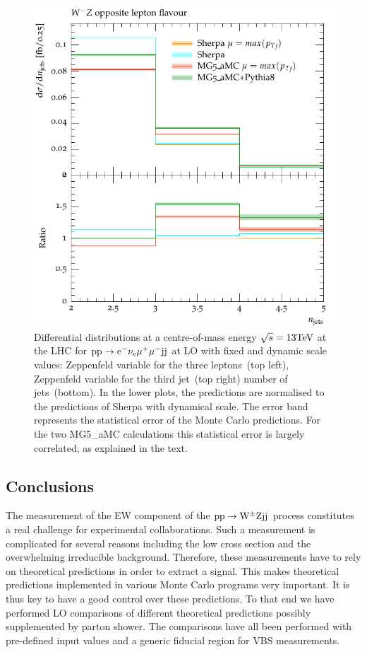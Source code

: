 \documentclass[11pt]{cernrep}
\begin{document}
\begin{figure}[htbp]
\begin{center}
   \includegraphics[scale=0.65]{figs/dyn_WmZ_OF_nJets}
\caption{Differential distributions at a centre-of-mass energy $\sqrt{s}=13{\rm TeV}$ at the LHC for ${\rm p} {\rm p} \to {\rm e}^-  \nu_{\rm e}  \mu^+ \mu^- {\rm j} {\rm j}$ at LO with fixed and dynamic scale values: 
                Zeppenfeld variable for the three leptons~(top left),
                Zeppenfeld variable for the third jet~(top right)
                number of jets~(bottom).
                In the lower plots, the predictions are normalised to the predictions of {\sc Sherpa} with dynamical scale. The error band represents
                the statistical error of the Monte Carlo predictions. For the two {\sc MG5\_aMC}
                calculations this statistical error is largely correlated, as explained in the text.}
\label{vbs_fig_shower_2b}
\end{center}
\end{figure}

\subsection{Conclusions \label{vbs_concl}}

The measurement of the EW component of the ${\rm p}{\rm p} \to {\rm W}^{\pm}{\rm Z}{\rm j}{\rm j}$ process constitutes a real challenge for experimental collaborations.
Such a measurement is complicated for several reasons including the low cross section and the overwhelming irreducible background.
Therefore, these measurements have to rely on theoretical predictions in order to extract a signal.
This makes theoretical predictions implemented in various Monte Carlo programs very important.
It is thus key to have a good control over these predictions.
To that end we have performed LO comparisons of different theoretical predictions possibly supplemented by parton shower.
The comparisons have all been performed with pre-defined input values and a generic fiducial region for VBS measurements.
\end{document}
